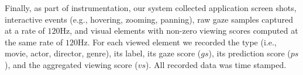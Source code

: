 Finally, as part of instrumentation, our system collected application screen shots, interactive events (e.g., hovering, zooming, panning), raw gaze samples captured at a rate of $120$Hz, and visual elements with non-zero viewing scores computed at the same rate of $120$Hz. For each viewed element we recorded the type (i.e., movie, actor, director, genre), its label, its gaze score ($gs$), its prediction score ($ps$), and the aggregated viewing score ($vs$). All recorded data was time stamped.

